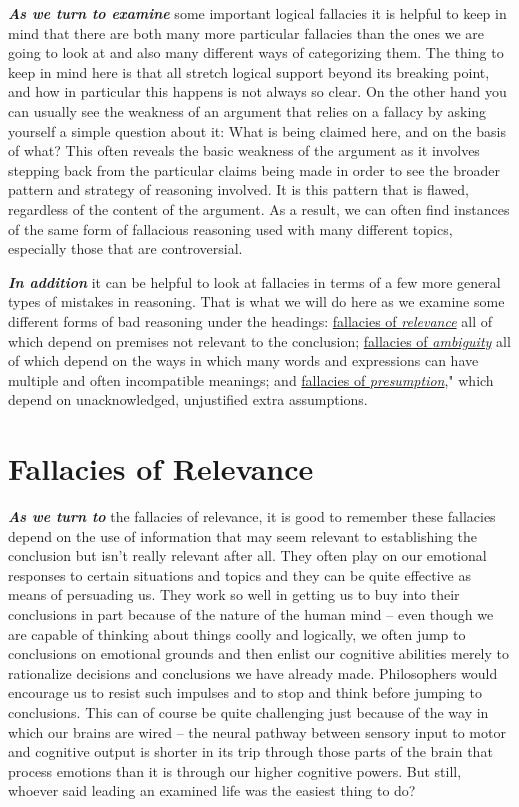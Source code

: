 \documentclass[12pt, openany]{book}
\begin{document}
\textbf{\emph{As we turn to examine}} some important logical fallacies it is helpful to keep in mind that there are both many more particular fallacies than the ones we are going to look at and also many different ways of categorizing them. The thing to keep in mind here is that all stretch logical support beyond its breaking point, and how in particular this happens is not always so clear. On the other hand you can usually see the weakness of an argument that relies on a fallacy by asking yourself a simple question about it: What is being claimed here, and on the basis of what? This often reveals the basic weakness of the argument as it involves stepping back from the particular claims being made in order to see the broader pattern and strategy of reasoning involved. It is this pattern that is flawed, regardless of the content of the argument. As a result, we can often find instances of the same form of fallacious reasoning used with many different topics, especially those that are controversial.

\textbf{\emph{In addition}} it can be helpful to look at fallacies in terms of a few more general types of mistakes in reasoning. That is what we will do here as we examine some different forms of bad reasoning under the headings: \protect\hyperlink{relevance}{fallacies of \emph{relevance}} all of which depend on premises not relevant to the conclusion; \protect\hyperlink{ambiguity}{fallacies of \emph{ambiguity}} all of which depend on the ways in which many words and expressions can have multiple and often incompatible meanings; and \protect\hyperlink{presumption}{fallacies of \emph{presumption}}," which depend on unacknowledged, unjustified extra assumptions.

\hypertarget{relevance}{%
\section{Fallacies of Relevance}\label{relevance}}

\textbf{\emph{As we turn to}} the fallacies of relevance, it is good to remember these fallacies depend on the use of information that may seem relevant to establishing the conclusion but isn't really relevant after all. They often play on our emotional responses to certain situations and topics and they can be quite effective as means of persuading us. They work so well in getting us to buy into their conclusions in part because of the nature of the human mind -- even though we are capable of thinking about things coolly and logically, we often jump to conclusions on emotional grounds and then enlist our cognitive abilities merely to rationalize decisions and conclusions we have already made. Philosophers would encourage us to resist such impulses and to stop and think before jumping to conclusions. This can of course be quite challenging just because of the way in which our brains are wired -- the neural pathway between sensory input to motor and cognitive output is shorter in its trip through those parts of the brain that process emotions than it is through our higher cognitive powers. But still, whoever said leading an examined life was the easiest thing to do?
\end{document}

